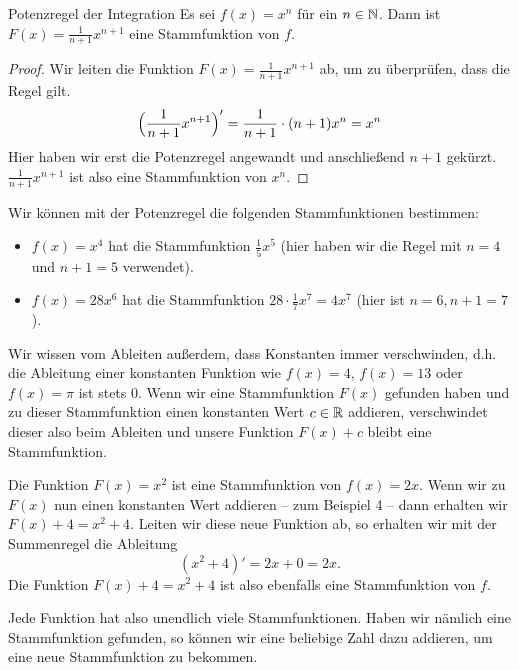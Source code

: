 \documentclass[../../main.tex]{subfiles}
\begin{document}
\begin{theorem}{Potenzregel der Integration}
    Es sei $f(x)=x^n$ für ein $n\in\mathbb{N}$. Dann ist $F(x)=\frac{1}{n+1}x^{n+1}$ eine Stammfunktion von $f$.
\end{theorem}
\begin{proof}
    Wir leiten die Funktion $F(x)=\frac{1}{n+1}x^{n+1}$ ab, um zu überprüfen, dass die Regel gilt.
    \[\Bigl(\frac{1}{n+1}x^{n+1}\Bigr)'=\frac{1}{n+1}\cdot (n+1)x^n=x^n\]
    Hier haben wir erst die Potenzregel angewandt und anschließend $n+1$ gekürzt. $\frac{1}{n+1}x^{n+1}$ ist 
    also eine Stammfunktion von $x^n$.
\end{proof}
\begin{example}[ex:potenzintegration]{}
    Wir können mit der Potenzregel die folgenden Stammfunktionen bestimmen:
    \begin{itemize}
        \item $f(x)=x^4$ hat die Stammfunktion $\frac{1}{5}x^5$ (hier haben wir die Regel mit $n=4$ und $n+1=5$ verwendet).
        \item $f(x)=28x^6$ hat die Stammfunktion $28\cdot\frac{1}{7}x^7=4x^7$ (hier ist $n=6,n+1=7$).
    \end{itemize}
\end{example}
Wir wissen vom Ableiten außerdem, dass Konstanten immer verschwinden, d.h. die Ableitung einer konstanten Funktion wie
$f(x)=4$, $f(x)=13$ oder $f(x)=\pi$ ist stets $0$. Wenn wir eine Stammfunktion $F(x)$ gefunden haben und zu dieser Stammfunktion
einen konstanten Wert $c\in\mathbb{R}$ addieren, verschwindet dieser also beim Ableiten und unsere Funktion $F(x)+c$ bleibt eine
Stammfunktion.
\begin{example}{}
    Die Funktion $F(x)=x^2$ ist eine Stammfunktion von $f(x)=2x$. Wenn wir zu $F(x)$ nun einen konstanten Wert addieren --
    zum Beispiel 4 -- dann erhalten wir $F(x)+4=x^2+4$. Leiten wir diese neue Funktion ab, so erhalten wir mit der
    Summenregel die Ableitung
    \[(x^2+4)'=2x+0=2x.\]
    Die Funktion $F(x)+4=x^2+4$ ist also ebenfalls eine Stammfunktion von $f$.
\end{example}
Jede Funktion hat also unendlich viele Stammfunktionen. Haben wir nämlich eine Stammfunktion gefunden, so können wir
eine beliebige Zahl dazu addieren, um eine neue Stammfunktion zu bekommen.
\end{document}
